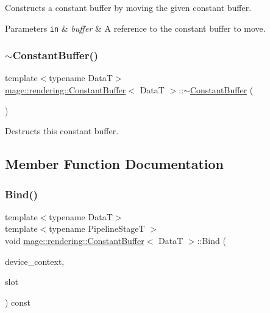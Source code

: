 Constructs a constant buffer by moving the given constant buffer.


\begin{DoxyParams}[1]{Parameters}
\mbox{\tt in}  & {\em buffer} & A reference to the constant buffer to move. \\
\hline
\end{DoxyParams}
\mbox{\label{classmage_1_1rendering_1_1_constant_buffer_a9c8ea67e36a9e80cfaabebdc0de2fae7}} 
\subsubsection{\texorpdfstring{$\sim$\+Constant\+Buffer()}{~ConstantBuffer()}}
{\footnotesize\ttfamily template$<$typename DataT$>$ \\
\mbox{\hyperlink{classmage_1_1rendering_1_1_constant_buffer}{mage\+::rendering\+::\+Constant\+Buffer}}$<$ DataT $>$\+::$\sim$\mbox{\hyperlink{classmage_1_1rendering_1_1_constant_buffer}{Constant\+Buffer}} (\begin{DoxyParamCaption}{ }\end{DoxyParamCaption})\hspace{0.3cm}{\ttfamily [default]}}

Destructs this constant buffer. 

\subsection{Member Function Documentation}
\mbox{\label{classmage_1_1rendering_1_1_constant_buffer_a810344fa71c98ee900f717351587a2f3}} 
\subsubsection{\texorpdfstring{Bind()}{Bind()}}
{\footnotesize\ttfamily template$<$typename DataT$>$ \\
template$<$typename Pipeline\+StageT $>$ \\
void \mbox{\hyperlink{classmage_1_1rendering_1_1_constant_buffer}{mage\+::rendering\+::\+Constant\+Buffer}}$<$ DataT $>$\+::Bind (\begin{DoxyParamCaption}\item[{I\+D3\+D11\+Device\+Context \&}]{device\+\_\+context,  }\item[{\mbox{\hyperlink{namespacemage_a41c104c036fba3756a74e19f793eeaa1}{U32}}}]{slot }\end{DoxyParamCaption}) const\hspace{0.3cm}{\ttfamily [noexcept]}}


